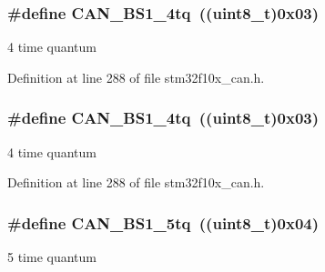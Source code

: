 \subsubsection[{\texorpdfstring{C\+A\+N\+\_\+\+B\+S1\+\_\+4tq}{CAN_BS1_4tq}}]{\setlength{\rightskip}{0pt plus 5cm}\#define C\+A\+N\+\_\+\+B\+S1\+\_\+4tq~(({\bf uint8\+\_\+t})0x03)}\hypertarget{group___c_a_n__time__quantum__in__bit__segment__1_ga7c5c668200f41991e14b31ca20235000}{}\label{group___c_a_n__time__quantum__in__bit__segment__1_ga7c5c668200f41991e14b31ca20235000}
4 time quantum 

Definition at line 288 of file stm32f10x\+\_\+can.\+h.

\subsubsection[{\texorpdfstring{C\+A\+N\+\_\+\+B\+S1\+\_\+4tq}{CAN_BS1_4tq}}]{\setlength{\rightskip}{0pt plus 5cm}\#define C\+A\+N\+\_\+\+B\+S1\+\_\+4tq~(({\bf uint8\+\_\+t})0x03)}\hypertarget{group___c_a_n__time__quantum__in__bit__segment__1_ga7c5c668200f41991e14b31ca20235000}{}\label{group___c_a_n__time__quantum__in__bit__segment__1_ga7c5c668200f41991e14b31ca20235000}
4 time quantum 

Definition at line 288 of file stm32f10x\+\_\+can.\+h.

\subsubsection[{\texorpdfstring{C\+A\+N\+\_\+\+B\+S1\+\_\+5tq}{CAN_BS1_5tq}}]{\setlength{\rightskip}{0pt plus 5cm}\#define C\+A\+N\+\_\+\+B\+S1\+\_\+5tq~(({\bf uint8\+\_\+t})0x04)}\hypertarget{group___c_a_n__time__quantum__in__bit__segment__1_ga31dea95492dababfcf79bcaeb884b99e}{}\label{group___c_a_n__time__quantum__in__bit__segment__1_ga31dea95492dababfcf79bcaeb884b99e}
5 time quantum 

